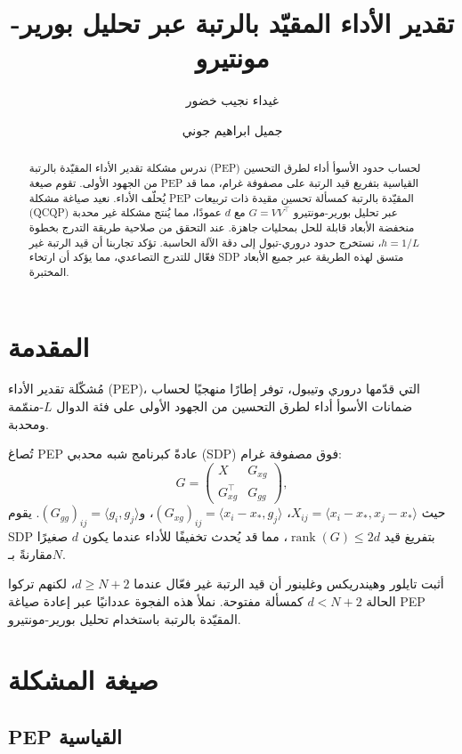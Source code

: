 \documentclass[12pt,a4paper]{article}
\title{\textbf{تقدير الأداء المقيّد بالرتبة عبر تحليل بورير-مونتيرو}}
\author{غيداء نجيب خضور \and جميل ابراهيم جوني}
\date{}
\theoremstyle{arabicremark}
\begin{document}
\maketitle

\begin{abstract}
ندرس مشكلة تقدير الأداء المقيّدة بالرتبة (PEP) لحساب حدود الأسوأ أداء لطرق التحسين من الجهود الأولى. تقوم صيغة PEP القياسية بتفريغ قيد الرتبة على مصفوفة غرام، مما قد يُحلّف الأداء. نعيد صياغة مشكلة PEP المقيّدة بالرتبة كمسألة تحسين مقيدة ذات تربيعات (QCQP) عبر تحليل بورير-مونتيرو $G = VV^\top$ مع $d$ عمودًا، مما يُنتج مشكلة غير محدبة منخفضة الأبعاد قابلة للحل بمحليات جاهزة. عند التحقق من صلاحية طريقة التدرج بخطوة $h=1/L$، نستخرج حدود دروري-تبول إلى دقة الآلة الحاسبة. تؤكد تجاربنا أن قيد الرتبة غير فعّال للتدرج التصاعدي، مما يؤكد أن ارتخاء SDP متسق لهذه الطريقة عبر جميع الأبعاد المختبرة.
\end{abstract}

\section{المقدمة}

مُشكّلة تقدير الأداء (PEP)، التي قدّمها دروري وتيبول، توفر إطارًا منهجيًا لحساب ضمانات الأسوأ أداء لطرق التحسين من الجهود الأولى على فئة الدوال $L$-منمّمة ومحدبة.

تُصاغ PEP عادةً كبرنامج شبه محدبي (SDP) فوق مصفوفة غرام:
\[
G = \begin{pmatrix} X & G_{xg} \\ G_{xg}^\top & G_{gg} \end{pmatrix},
\]
حيث $X_{ij} = \langle x_i - x_*, x_j - x_*\rangle$، $(G_{xg})_{ij} = \langle x_i - x_*, g_j\rangle$، و$(G_{gg})_{ij} = \langle g_i, g_j\rangle$. يقوم SDP بتفريغ قيد $\operatorname{rank}(G) \leq 2d$، مما قد يُحدث تخفيفًا للأداء عندما يكون $d$ صغيرًا مقارنةً بـ$N$.

أثبت تايلور وهيندريكس وغلينور أن قيد الرتبة غير فعّال عندما $d \geq N+2$، لكنهم تركوا الحالة $d < N+2$ كمسألة مفتوحة. نملأ هذه الفجوة عددانيًا عبر إعادة صياغة PEP المقيّدة بالرتبة باستخدام تحليل بورير-مونتيرو.

\section{صيغة المشكلة}

\subsection{PEP القياسية}
\end{document}

